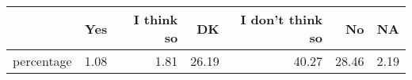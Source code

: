 \begin{table}[ht]
\centering
\begin{tabular}{rrrrrrr}
  \hline
 & Yes & I think so & DK & I don't think so & No & NA \\ 
  \hline
percentage & 1.08 & 1.81 & 26.19 & 40.27 & 28.46 & 2.19 \\ 
   \hline
\end{tabular}
\end{table}
